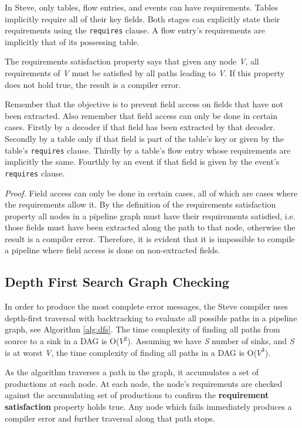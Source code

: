 In Steve, only tables, flow entries, and events can have requirements. Tables implicitly require all of their key fields. Both stages can explicitly state their requirements using the \texttt{\color{blue}requires} clause. A flow entry's requirements are implicitly that of its possessing table.

The requirements satisfaction property says that given any node \textit{V}, all requirements of \textit{V} must be satisfied by all paths leading to \textit{V}. If this property does not hold true, the result is a compiler error.

Remember that the objective is to prevent field access on fields that have not been extracted. Also remember that field access can only be done in certain cases. Firstly by a decoder if that field has been extracted by that decoder. Secondly by a table only if that field is part of the table's key or given by the table's \texttt{\color{blue}requires} clause. Thirdly by a table's flow entry whose requirements are implicitly the same. Fourthly by an event if that field is given by the event's \texttt{\color{blue}requires} clause.

\textit{Proof.} Field access can only be done in certain cases, all of which are cases where the requirements allow it. By the definition of the requirements satisfaction property all nodes in a pipeline graph must have their requirements satisfied, i.e. those fields must have been extracted along the path to that node, otherwise the result is a compiler error. Therefore, it is evident that it is impossible to compile a pipeline where field access is done on non-extracted fields.

\subsection{Depth First Search Graph Checking} \label{dfs_desc}

In order to produce the most complete error messages, the Steve compiler uses depth-first traversal with backtracking to evaluate all possible paths in a pipeline graph, see Algorithm \ref{alg:dfs}. The time complexity of finding all paths from source to a sink in a DAG is O($V^2$). Assuming we have \textit{S} number of sinks, and \textit{S} is at worst \textit{V}, the time complexity of finding all paths in a DAG is O($V^3$).

As the algorithm traverses a path in the graph, it accumulates a set of productions at each node. At each node, the node's requirements are checked against the accumulating set of productions to confirm the \textbf{requirement satisfaction} property holds true. Any node which fails immediately produces a compiler error and further traversal along that path stops.


